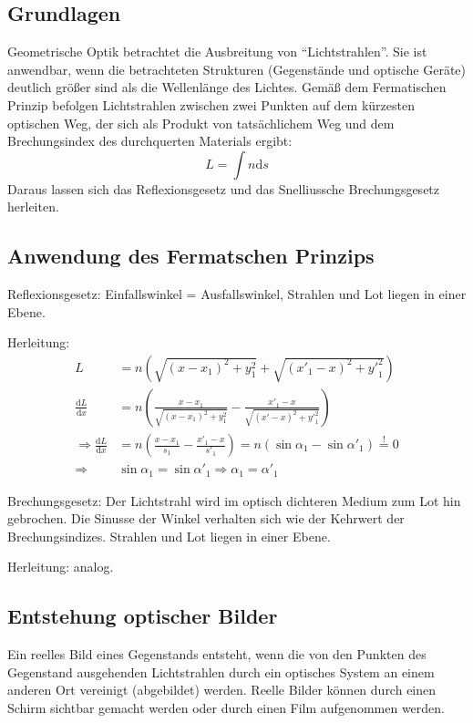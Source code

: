 \documentclass[a4paper]{scrartcl}
\begin{document}
\subsection{Grundlagen}
Geometrische Optik betrachtet die Ausbreitung von "`Lichtstrahlen"'. Sie ist anwendbar, wenn die betrachteten Strukturen (Gegenstände und optische Geräte) deutlich größer sind als die Wellenlänge des Lichtes. Gemäß dem Fermatischen Prinzip befolgen Lichtstrahlen zwischen zwei Punkten auf dem kürzesten optischen Weg, der sich als Produkt von tatsächlichem Weg und dem Brechungsindex des durchquerten Materials ergibt:
\begin{equation*}
  L = \int n\text{d}s
\end{equation*}
Daraus lassen sich das Reflexionsgesetz und das Snelliussche Brechungsgesetz herleiten.

\subsection{Anwendung des Fermatschen Prinzips}
Reflexionsgesetz: Einfallswinkel = Ausfallswinkel, Strahlen und Lot liegen in einer Ebene.

Herleitung: 
\begin{align*}
  L & = n \left( \sqrt{(x-x_1)^2+y_1^2} + \sqrt{(x'_1-x)^2 + {y'}_1^2}\right) \\
  \frac{\text{d}L}{\text{d}x} & = n \left( \frac{x-x_1}{\sqrt{(x-x_1)^2 + y_1^2}} - \frac{x'_1-x}{\sqrt{(x'-x)^2+{y'}_1^2}} \right) \\
  \Rightarrow \frac{\text{d}L}{\text{d}x} &= n \left( \frac{x-x_1}{s_1} - \frac{x'_1-x}{s'_1} \right) = n (\sin\alpha_1 - \sin\alpha'_1) \stackrel{!}{=} 0 \\
  \Rightarrow & \sin\alpha_1 = \sin\alpha'_1 \Rightarrow \alpha_1 = \alpha'_1
\end{align*}

Brechungsgesetz: Der Lichtstrahl wird im optisch dichteren Medium zum Lot hin gebrochen. Die Sinusse der Winkel verhalten sich wie der Kehrwert der Brechungsindizes. Strahlen und Lot liegen in einer Ebene.

Herleitung: analog.

\subsection{Entstehung optischer Bilder}
Ein reelles Bild eines Gegenstands entsteht, wenn die von den Punkten des Gegenstand ausgehenden Lichtstrahlen durch ein optisches System an einem anderen Ort vereinigt (abgebildet) werden. Reelle Bilder können durch einen Schirm sichtbar gemacht werden oder durch einen Film aufgenommen werden.
\end{document}
